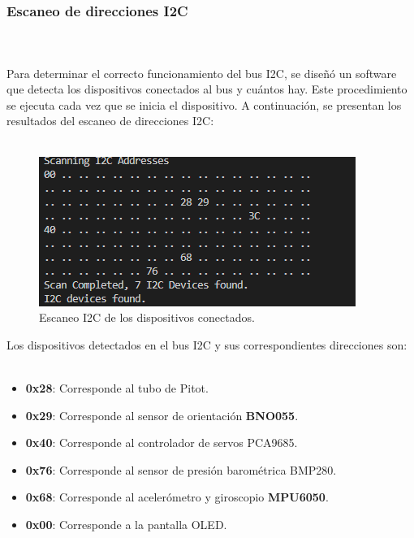 \\ \\
\subsubsection{Escaneo de direcciones I2C} \\ \\

Para determinar el correcto funcionamiento del bus I2C, se diseñó un software que detecta los dispositivos conectados al bus y cuántos hay. Este procedimiento se ejecuta cada vez que se inicia el dispositivo. A continuación, se presentan los resultados del escaneo de direcciones I2C:\\ \\

\begin{figure}[H]
    \centering
    \includegraphics[width=10 cm]{Imagenes/Metodologia/I2C_scan.png}
    \caption{Escaneo I2C de los dispositivos conectados.}
    \label{fig:i2c_scan}
\end{figure}

Los dispositivos detectados en el bus I2C y sus correspondientes direcciones son:\\ \\

\begin{itemize}
    \item \textbf{0x28}: Corresponde al tubo de Pitot.
    \item \textbf{0x29}: Corresponde al sensor de orientación \textbf{BNO055}.
    \item \textbf{0x40}: Corresponde al controlador de servos PCA9685.
    \item \textbf{0x76}: Corresponde al sensor de presión barométrica BMP280.
    \item \textbf{0x68}: Corresponde al acelerómetro y giroscopio \textbf{MPU6050}.
    \item \textbf{0x00}: Corresponde a la pantalla OLED.
\end{itemize}\\ \\






